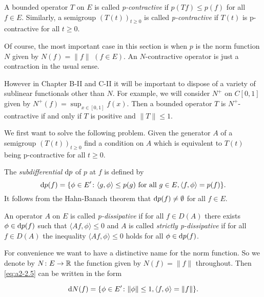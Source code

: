 A bounded operator $T$ on $E$ is called \emph{p-contractive} if $p(Tf) \leq p(f)$ for all $f \in E$.
Similarly, a semigroup $(T(t))_{t\geq 0}$ is called \emph{p-contractive} if $T(t)$ is p-contractive for all $t \geq 0$.

Of course, the most important case in this section is when $p$ is the norm function $N$ given by $N(f) = \|f\|$ $(f \in E)$.
An $N$-contractive operator is just a contraction in the usual sense.\\
\begin{remark*} \label{rem:a2-2.1-kgk}
However in Chapter B-II and C-II it will be important to dispose of a variety of sublinear functionals other than $N$.
For example, we will consider $N^{+}$ on $C[0,1]$ given by $N^{+}(f) = \sup_{x \in [0,1]} f(x)$.
Then a bounded operator $T$ is $N^{+}$-contractive if and only if $T$ is positive and $\|T\| \leq 1$.
\end{remark*}

We first want to solve the following problem.
Given the generator $A$ of a semigroup $(T(t))_{t\geq 0}$ find a condition on $A$ which is equivalent to $T(t)$ being p-contractive for all $t \geq 0$.

The \emph{subdifferential} $\mathop{}\!\mathrm{d}{p}$ of $p$ at $f$ is defined by
\begin{equation}\label{eq:a2-2.5}
\mathop{}\!\mathrm{d}{p}(f) = \{\phi \in E' \colon \langle g,\phi \rangle \leq p(g) \text{ for all } g \in E, \langle f,\phi \rangle = p(f) \}.
\end{equation}
It follows from the Hahn-Banach theorem that $\mathop{}\!\mathrm{d}{p}(f) \neq \emptyset$ for all $f \in E$.

\begin{definition}\label{def:a2-2.1}
An operator $A$ on $E$ is called \emph{p-dissipative} if for all $f \in D(A)$ there exists $\phi \in \mathop{}\!\mathrm{d}{p}(f)$ such that $\langle Af,\phi \rangle \leq 0$ 
and $A$ is called \emph{strictly p-dissipative} if for all $f \in D(A)$ the inequality $\langle Af,\phi \rangle \leq 0$ holds for all $\phi \in \mathop{}\!\mathrm{d}{p}(f)$.
\end{definition}
For convenience we want to have a distinctive name for the norm function.
So we denote by $N \colon E \to \mathbb{R}$ the function given by $N(f) = \|f\|$ throughout.
Then \eqref{eq:a2-2.5}   can be written in the form

\begin{equation}\label{eq:a2-2.6}
\mathop{}\!\mathrm{d}{N}(f) = \{\phi \in E' \colon \|\phi\|\leq 1, \langle f,\phi \rangle = \|f\|\}.
\end{equation}

